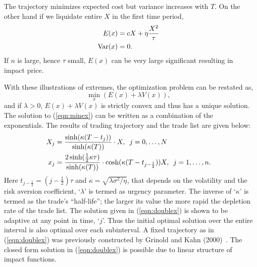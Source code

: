 The trajectory minimizes expected cost but variance increases with $T$. On the other hand if we liquidate entire $X$ in the first time period,
	\begin{equation}\label{eqn:anotherdoubleex}
	\begin{split}
	E(x)&= c X + \eta \frac{X^2}{\tau} \\
	\Var(x)&= 0.
	\end{split}
	\end{equation}
If $n$ is large, hence $\tau$ small, $E(x)$ can be very large significant resulting in impact price.


 With these illustrations of extremes, the optimization problem can be restated as,
	\begin{equation}\label{eqn:minex}
	\min_x (E(x) + \lambda V(x)),
	\end{equation}
and if $\lambda>0$, $E(x)+\lambda V(x)$ is strictly convex and thus has a unique solution. The solution to (\ref{eqn:minex}) can be written as a combination of the exponentials. The results of trading trajectory and the trade list are given below:
	\begin{equation}\label{eqn:doublex}
	\begin{split}
	X_j &= \dfrac{\sinh (\kappa(T-t_j))}{\sinh (\kappa(T))}\cdot X, \enskip j=0,\ldots,N \\
	x_j &= \dfrac{2 \sinh (\frac{1}{2}\kappa\tau)}{\sinh (\kappa(T))}\cdot \cosh(\kappa(T-t_{j-\frac{1}{2}}))X, \enskip j=1,\ldots, n.
	\end{split}
	\end{equation}
Here $t_{j-\frac{1}{2}} = (j - \frac{1}{2})\tau$ and $\kappa = \sqrt{\lambda\sigma^2/\eta}$, that depends on the volatility and the risk aversion coefficient, `$\lambda$' is termed as urgency parameter. The inverse of `$\kappa$' is termed as the trade's ``half-life''; the larger its value the more rapid the depletion rate of the trade list. The solution given in (\ref{eqn:doublex}) is shown to be adaptive at any point in time, `$j$'. Thus the initial optimal solution over the entire interval is also optimal over each subinterval. A fixed trajectory as in (\ref{eqn:doublex}) was previously constructed by Grinold and Kahn (2000)~\cite{grin2000}. The closed form solution in (\ref{eqn:doublex}) is possible due to linear structure of impact functions. 



